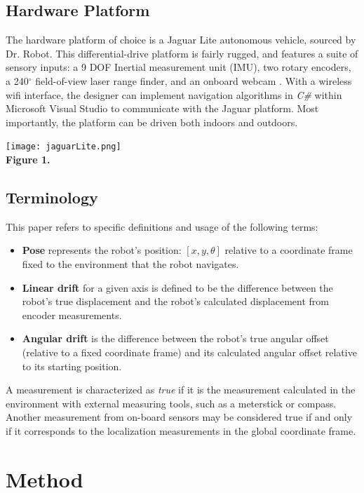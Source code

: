 \documentclass[conference]{IEEEtran}
\begin{document}
\subsection{Hardware Platform}
The hardware platform of choice is a Jaguar Lite autonomous vehicle, sourced 
by Dr. Robot.  This differential-drive platform is fairly rugged, and 
features a suite of sensory inputs: a 9 DOF Inertial measurement unit (IMU), 
two rotary encoders, a 240$^{\circ}$ field-of-view laser range finder, and an
onboard webcam \cite{Dr.RobotWebsite}.  With a wireless wifi interface, the 
designer can implement navigation algorithms in \emph{C\#} within Microsoft Visual Studio to communicate with the Jaguar platform. Most importantly, the platform can  be driven both 
indoors and outdoors. 


\texttt{[image: jaguarLite.png]}\\
\textbf{Figure 1.}

\subsection{Terminology}
This paper refers to specific definitions and usage of the following terms:

\begin{itemize}
\item \noindent \textbf{Pose} represents the robot's position: $[x,y,\theta]$ relative to a 
coordinate frame fixed to the environment that the robot navigates.

\item \noindent\textbf{Linear drift} for a given axis is defined to be the difference between the 
robot's true displacement and the robot's calculated displacement from encoder
measurements.

\item \noindent\textbf{Angular drift}  is the difference between the robot's true 
angular offset (relative to a fixed coordinate frame) and its 
calculated angular offset relative to its starting position.
\end{itemize}

A measurement is characterized as \emph{true} if it is the measurement calculated 
in the environment with external measuring tools, such as a meterstick or
compass. Another measurement from on-board sensors may be considered true if and only if it corresponds to the localization measurements in the global coordinate frame.
 
\section{Method}
\end{document}
